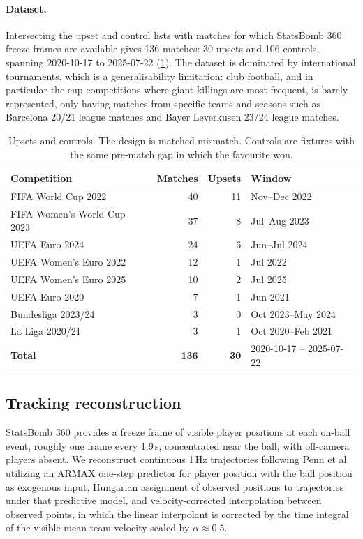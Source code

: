 \documentclass[11pt,a4paper]{article}
\begin{document}
\paragraph{Dataset.} Intersecting the upset and control lists with matches for
which StatsBomb 360 freeze frames are available \cite{statsbomb} gives 136
matches: 30 upsets and 106 controls, spanning 2020-10-17 to 2025-07-22
(\cref{tab:corpus}). The dataset is dominated by international tournaments, which is a
generalisability limitation: club football, and in particular the cup competitions where
giant killings are most frequent, is barely represented, only having matches from specific teams and seasons such as Barcelona 20/21 league matches and Bayer Leverkusen 23/24 league matches.

\begin{table}[H]
\centering
\small
\begin{tabular}{@{}lrrl@{}}
\toprule
\textbf{Competition} & \textbf{Matches} & \textbf{Upsets} & \textbf{Window} \\
\midrule
FIFA World Cup 2022        & 40 & 11 & Nov--Dec 2022 \\
FIFA Women's World Cup 2023& 37 &  8 & Jul--Aug 2023 \\
UEFA Euro 2024             & 24 &  6 & Jun--Jul 2024 \\
UEFA Women's Euro 2022     & 12 &  1 & Jul 2022 \\
UEFA Women's Euro 2025     & 10 &  2 & Jul 2025 \\
UEFA Euro 2020             &  7 &  1 & Jun 2021 \\
Bundesliga 2023/24         &  3 &  0 & Oct 2023--May 2024 \\
La Liga 2020/21            &  3 &  1 & Oct 2020--Feb 2021 \\
\midrule
\textbf{Total}             & \textbf{136} & \textbf{30} & 2020-10-17 -- 2025-07-22 \\
\bottomrule
\end{tabular}
\caption{Upsets and controls. The design is matched-mismatch. Controls are fixtures with the
same pre-match gap in which the favourite won.}
\label{tab:corpus}
\end{table}

\subsection{Tracking reconstruction}

StatsBomb 360 provides a freeze frame of visible player positions at each on-ball event, roughly one frame every 1.9\,s, concentrated near the ball, with off-camera players
absent. We reconstruct continuous 1\,Hz trajectories following Penn et al.\
\cite{penn2023} utilizing an ARMAX one-step predictor for player position with the ball position as
exogenous input, Hungarian assignment of observed positions to trajectories under that
predictive model, and velocity-corrected interpolation between observed points, in which
the linear interpolant is corrected by the time integral of the visible mean team velocity
scaled by $\alpha\approx0.5$.
\end{document}
